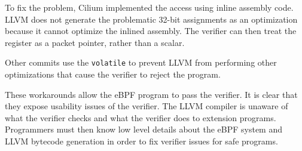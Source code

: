 


To fix the problem, Cilium implemented the access using inline assembly code. %
LLVM does not generate the problematic 32-bit assignments as an optimization because it cannot optimize the
    inlined assembly.
The verifier can then treat the register as a packet pointer, rather than a scalar.

Other commits use the \texttt{volatile} to prevent LLVM from performing other optimizations
    that cause the verifier to reject the program.

These workarounds allow the eBPF program to pass the verifier.
It is clear that they expose usability issues of the verifier.
The LLVM compiler is unaware of what the verifier checks and what the verifier does to extension programs.
Programmers must then know low level details about the eBPF system and LLVM bytecode generation in order to fix verifier issues for safe programs.


%    

%    



